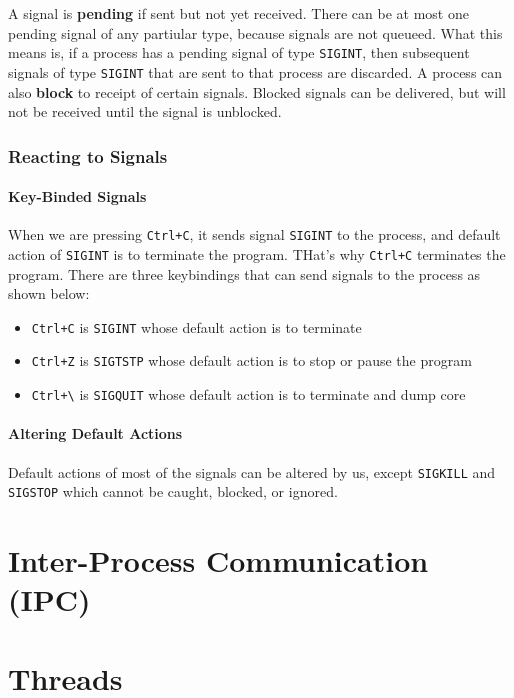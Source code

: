 \documentclass{article}
\newcommand{\bold}[1]{\textbf{#1}}
\renewcommand{\b}{\item[$\circ$]}
\newcommand{\newlist}{\begin{itemize}}
\renewcommand{\endlist}{\end{itemize}}
\newcommand{\code}[1]{\texttt{#1}}
\begin{document}
A signal is \bold{pending} if sent but not yet received. There can be at most one pending signal of any partiular type, because signals are not queueed. What this means is, if a process has a pending signal of type \code{SIGINT}, then subsequent signals of type \code{SIGINT} that are sent to that process are discarded. A process can also \bold{block} to receipt of certain signals. Blocked signals can be delivered, but will not be received until the signal is unblocked. 

\subsubsection{Reacting to Signals}

\paragraph{Key-Binded Signals}

When we are pressing \code{Ctrl+C}, it sends signal \code{SIGINT} to the process, and default action of \code{SIGINT} is to terminate the program. THat's why \code{Ctrl+C} terminates the program. There are three keybindings that can send signals to the process as shown below:

\newlist 
\b \code{Ctrl+C} is \code{SIGINT} whose default action is to terminate
\b \code{Ctrl+Z} is \code{SIGTSTP} whose default action is to stop or pause the program
\b \code{Ctrl+\textbackslash} is \code{SIGQUIT} whose default action is to terminate and dump core
\endlist 

\paragraph{Altering Default Actions}

Default actions of most of the signals can be altered by us, except \code{SIGKILL} and \code{SIGSTOP} which cannot be caught, blocked, or ignored. 

\newpage
\section{Inter-Process Communication (IPC)}
\section{Threads}
\end{document}
